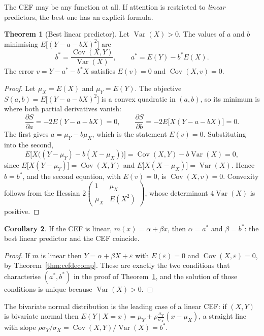 \documentclass[11pt,a4paper]{article}
\numberwithin{equation}{section}
\DeclareMathOperator{\Var}{Var}
\DeclareMathOperator{\Cov}{Cov}
\theoremstyle{definition}
\newtheorem{thm}{Theorem}[subsection]
\newtheorem{coro}[thm]{Corollary}
\begin{document}
The CEF may be any function at all. If attention is restricted to \emph{linear} predictors, the best one has an explicit formula.

\begin{thm}[Best linear predictor]
\label{thm:blp}
Let $\Var(X) > 0$. The values of $a$ and $b$ minimising $E\bigl[(Y - a - bX)^2\bigr]$ are
\[
b^* = \frac{\Cov(X, Y)}{\Var(X)}, \qquad a^* = E(Y) - b^* E(X) .
\]
The error $v = Y - a^* - b^* X$ satisfies $E(v) = 0$ and $\Cov(X, v) = 0$.
\end{thm}

\begin{proof}
Let $\mu_X = E(X)$ and $\mu_Y = E(Y)$. The objective $S(a, b) = E\bigl[(Y - a - bX)^2\bigr]$ is a convex quadratic in $(a, b)$, so its minimum is
where both partial derivatives vanish:
\[
\frac{\partial S}{\partial a} = -2E(Y - a - bX) = 0, \qquad \frac{\partial S}{\partial b} = -2E\bigl[X(Y - a - bX)\bigr] = 0 .
\]
The first gives $a = \mu_Y - b\mu_X$, which is the statement $E(v) = 0$. Substituting into the second,
\[
E\bigl[X\bigl((Y - \mu_Y) - b(X - \mu_X)\bigr)\bigr] = \Cov(X, Y) - b\Var(X) = 0 ,
\]
since $E\bigl[X(Y - \mu_Y)\bigr] = \Cov(X, Y)$ and $E\bigl[X(X - \mu_X)\bigr] = \Var(X)$. Hence $b = b^*$, and the second equation, with $E(v) = 0$, is
$\Cov(X, v) = 0$. Convexity follows from the Hessian
$2\begin{pmatrix} 1 & \mu_X \\ \mu_X & E(X^2)\end{pmatrix}$, whose determinant $4\Var(X)$ is positive.
\end{proof}

\begin{coro}
\label{coro:linearcef}
If the CEF is linear, $m(x) = \alpha + \beta x$, then $\alpha = a^*$ and $\beta = b^*$: the best linear predictor and the CEF coincide.
\end{coro}

\begin{proof}
If $m$ is linear then $Y = \alpha + \beta X + \varepsilon$ with $E(\varepsilon) = 0$ and $\Cov(X, \varepsilon) = 0$, by Theorem~\ref{thm:cefdecomp}.
These are exactly the two conditions that characterise $(a^*, b^*)$ in the proof of Theorem~\ref{thm:blp}, and the solution of those conditions
is unique because $\Var(X) > 0$.
\end{proof}

The bivariate normal distribution is the leading case of a linear CEF: if $(X, Y)$ is bivariate normal then
$E(Y \mid X = x) = \mu_Y + \rho \frac{\sigma_Y}{\sigma_X}(x - \mu_X)$, a straight line with slope
$\rho\sigma_Y/\sigma_X = \Cov(X, Y)/\Var(X) = b^*$.
\end{document}
